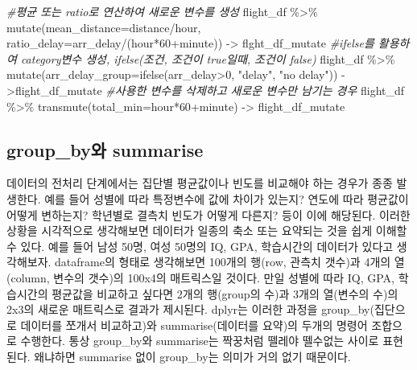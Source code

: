 \documentclass[
]{book}
\newenvironment{Shaded}{\begin{snugshade}}{\end{snugshade}}
\newcommand{\AttributeTok}[1]{\textcolor[rgb]{0.77,0.63,0.00}{#1}}
\newcommand{\CommentTok}[1]{\textcolor[rgb]{0.56,0.35,0.01}{\textit{#1}}}
\newcommand{\DecValTok}[1]{\textcolor[rgb]{0.00,0.00,0.81}{#1}}
\newcommand{\FunctionTok}[1]{\textcolor[rgb]{0.00,0.00,0.00}{#1}}
\newcommand{\NormalTok}[1]{#1}
\newcommand{\OtherTok}[1]{\textcolor[rgb]{0.56,0.35,0.01}{#1}}
\newcommand{\SpecialCharTok}[1]{\textcolor[rgb]{0.00,0.00,0.00}{#1}}
\newcommand{\StringTok}[1]{\textcolor[rgb]{0.31,0.60,0.02}{#1}}
\theoremstyle{definition}
\theoremstyle{definition}
\theoremstyle{definition}
\theoremstyle{definition}
\theoremstyle{remark}
\begin{document}
\begin{Shaded}
\begin{Highlighting}[]
\CommentTok{\#평균 또는 ratio로 연산하여 새로운 변수를 생성}
\NormalTok{flight\_df }\SpecialCharTok{\%\textgreater{}\%}
  \FunctionTok{mutate}\NormalTok{(}\AttributeTok{mean\_distance=}\NormalTok{distance}\SpecialCharTok{/}\NormalTok{hour, }
         \AttributeTok{ratio\_delay=}\NormalTok{arr\_delay}\SpecialCharTok{/}\NormalTok{(hour}\SpecialCharTok{*}\DecValTok{60}\SpecialCharTok{+}\NormalTok{minute)) }\OtherTok{{-}\textgreater{}}\NormalTok{ flght\_df\_mutate}
\CommentTok{\#ifelse를 활용하여 category변수 생성, ifelse(조건, 조건이 true일때, 조건이 false)}
\NormalTok{flight\_df }\SpecialCharTok{\%\textgreater{}\%}
  \FunctionTok{mutate}\NormalTok{(}\AttributeTok{arr\_delay\_group=}\FunctionTok{ifelse}\NormalTok{(arr\_delay}\SpecialCharTok{\textgreater{}}\DecValTok{0}\NormalTok{, }\StringTok{"delay"}\NormalTok{, }\StringTok{"no delay"}\NormalTok{)) }\OtherTok{{-}\textgreater{}}\NormalTok{flight\_df\_mutate}
\CommentTok{\#사용한 변수를 삭제하고 새로운 변수만 남기는 경우}
\NormalTok{flight\_df }\SpecialCharTok{\%\textgreater{}\%} 
  \FunctionTok{transmute}\NormalTok{(}\AttributeTok{total\_min=}\NormalTok{hour}\SpecialCharTok{*}\DecValTok{60}\SpecialCharTok{+}\NormalTok{minute) }\OtherTok{{-}\textgreater{}}\NormalTok{ flight\_df\_mutate}
\end{Highlighting}
\end{Shaded}

\hypertarget{group_byuxc640-summarise}{%
\subsection{group\_by와 summarise}\label{group_byuxc640-summarise}}

데이터의 전처리 단계에서는 집단별 평균값이나 빈도를 비교해야 하는 경우가 종종 발생한다. 예를 들어 성별에 따라 특정변수에 값에 차이가 있는지? 연도에 따라 평균값이 어떻게 변하는지? 학년별로 결측치 빈도가 어떻게 다른지? 등이 이에 해당된다.
이러한 상황을 시각적으로 생각해보면 데이터가 일종의 축소 또는 요약되는 것을 쉽게 이해할 수 있다.
예를 들어 남성 50명, 여성 50명의 IQ, GPA, 학습시간의 데이터가 있다고 생각해보자. dataframe의 형태로 생각해보면 100개의 행(row, 관측치 갯수)과 4개의 열(column, 변수의 갯수)의 100x4의 매트릭스일 것이다. 만일 성별에 따라 IQ, GPA, 학습시간의 평균값을 비교하고 싶다면 2개의 행(group의 수)과 3개의 열(변수의 수)의 2x3의 새로운 매트릭스로 결과가 제시된다.
dplyr는 이러한 과정을 group\_by(집단으로 데이터를 쪼개서 비교하고)와 summarise(데이터를 요약)의 두개의 명령어 조합으로 수행한다. 통상 group\_by와 summarise는 짝꿍처럼 뗄레야 뗄수없는 사이로 표현된다. 왜냐하면 summarise 없이 group\_by는 의미가 거의 없기 때문이다.
\end{document}
